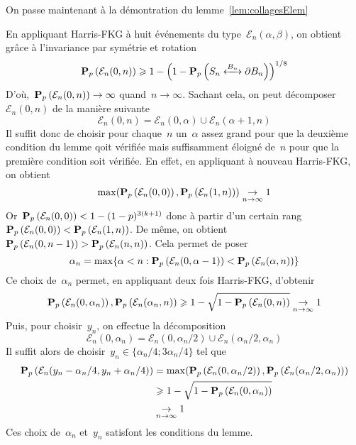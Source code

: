 		On passe maintenant à la démontration du lemme~\ref{lem:collagesElem} %
		\begin{dem}
			En appliquant Harris-FKG à huit événements du type~$\mathcal{E}_n(\alpha, \beta)$, on obtient grâce à l'invariance par symétrie et rotation %
			\[
				\Pp{\mathcal{E}_n(0,n)} \geq 1 - \left(1 - \Pp{\relie[B_n]{S_n}{\partial B_n}} \right)^{1/8} %
			\]
			D'où,~$\bm{\mathrm{P}}_{p}\left(\mathcal{E}_n(0, n)\right) \to \infty$ quand~$n \to \infty$. Sachant cela, on peut décomposer~$\mathcal{E}_n(0, n)$ de la manière suivante %
			\[
				\mathcal{E}_n(0, n) = \mathcal{E}_n(0, \alpha) \cup \mathcal{E}_n(\alpha + 1, n) %
			\]
			Il suffit donc de choisir pour chaque~$n$ un~$\alpha$ assez grand pour que la deuxième condition du lemme qoit vérifiée mais suffisamment éloigné de~$n$ pour que la première condition soit vérifiée. En effet, en appliquant à nouveau Harris-FKG, on obtient
			\[
				\max(\Pp{\mathcal{E}_n(0, 0)}, \Pp{\mathcal{E}_n(1, n)}) \underset{n \to \infty}{\to} 1 %
			\]
			Or~$\bm{\mathrm{P}}_{p}\left(\mathcal{E}_n(0,0)\right) < 1 - (1-p)^{3(k+1)}$ donc à partir d'un certain rang~$\bm{\mathrm{P}}_{p}\left(\mathcal{E}_n(0,0)\right) < \bm{\mathrm{P}}_{p}\left(\mathcal{E}_n(1, n)\right)$. De même, on obtient~$\bm{\mathrm{P}}_{p}\left(\mathcal{E}_n(0, n-1)\right) > \bm{\mathrm{P}}_{p}\left(\mathcal{E}_n(n, n)\right)$. Cela permet de poser %
			\[
				\alpha_n = \max \{ \alpha < n : \Pp{\mathcal{E}_n(0, \alpha - 1)} < \Pp{\mathcal{E}_n(\alpha, n)} \} %
			\]
			Ce choix de~$\alpha_n$ permet, en appliquant deux fois Harris-FKG, d'obtenir
			\[
				\Pp{\mathcal{E}_n(0, \alpha_n)}, \Pp{\mathcal{E}_n(\alpha_n, n)} \geq 1 - \sqrt{1  - \Pp{\mathcal{E}_n(0, n)}} \underset{n \to \infty}{\to} 1 %
			\]
			Puis, pour choisir~$y_n$, on effectue la décomposition
			\[
				\mathcal{E}_n(0, \alpha_n) = \mathcal{E}_n(0, \alpha_n/2) \cup \mathcal{E}_n(\alpha_n/2, \alpha_n) %
			\]
			Il suffit alors de choisir~$y_n \in \{ \alpha_n/4 ; 3\alpha_n/4 \}$ tel que
			\begin{align*} %
				\Pp{\mathcal{E}_n(y_n - \alpha_n/4, y_n + \alpha_n/4)} 
					& = \max(\Pp{\mathcal{E}_n (0, \alpha_n/2)}, \Pp{\mathcal{E}_n (\alpha_n/2, \alpha_n)}) \\
				       	& \geq 1 - \sqrt{1 - \Pp{\mathcal{E}_n(0, \alpha_n)}} \\ 
					& \underset{n \to \infty}{\to} 1 %
			\end{align*}
			Ces choix de~$\alpha_n$ et~$y_n$ satisfont les conditions du lemme.
		\end{dem}

